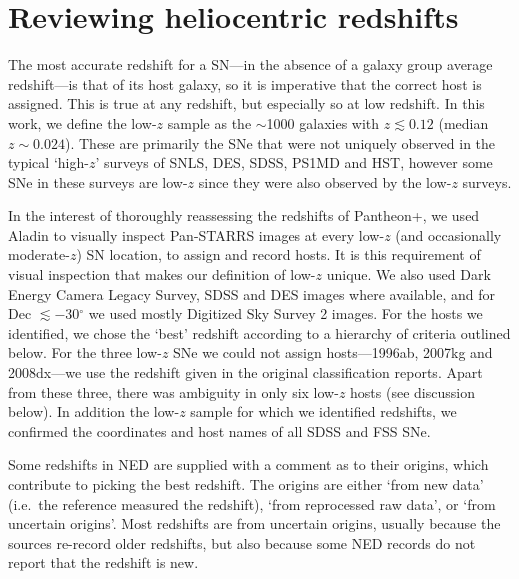 \documentclass[
  journal=pasa,
  manuscript=research-paper,
  year=2022,
]{cup-journal}
\newcommand\dg{\ensuremath{^{\circ}}}
\begin{document}
\section{Reviewing heliocentric redshifts}\label{sec:validhelio}
The most accurate redshift for a SN---in the absence of a galaxy group average redshift---is that of its host galaxy, so it is imperative that the correct host is assigned.
This is true at any redshift, but especially so at low redshift.
In this work, we define the low-$z$ sample as the $\sim$1000 galaxies with $z\lesssim0.12$ (median $z\sim 0.024$).
These are primarily the SNe that were not uniquely observed in the typical `high-$z$' surveys of SNLS, DES, SDSS, PS1MD and HST, however some SNe in these surveys are low-$z$ since they were also observed by the low-$z$ surveys.

In the interest of thoroughly reassessing the redshifts of Pantheon+, we used Aladin \citep{Bonnarel2000} to visually inspect Pan-STARRS images at every low-$z$ (and occasionally moderate-$z$) SN location, to assign and record hosts.
It is this requirement of visual inspection that makes our definition of low-$z$ unique.
We also used Dark Energy Camera Legacy Survey, SDSS and DES images where available, and for Dec $\lesssim-30\dg$ we used mostly Digitized Sky Survey 2 images.
For the hosts we identified, we chose the `best' redshift according to a hierarchy of criteria outlined below. 
For the three low-$z$ SNe we could not assign hosts---1996ab, 2007kg and 2008dx---we use the redshift given in the original classification reports. 
Apart from these three, there was ambiguity in only six low-$z$ hosts (see discussion below).
In addition the low-$z$ sample for which we identified redshifts, we confirmed the coordinates and host names of all SDSS and FSS SNe. 

Some redshifts in NED are supplied with a comment as to their origins, which contribute to picking the best redshift. 
The origins are either `from new data' (i.e.~the reference measured the redshift), `from reprocessed raw data', or `from uncertain origins'.
Most redshifts are from uncertain origins, usually because the sources re-record older redshifts, but also because some NED records do not report that the redshift is new.
\end{document}
